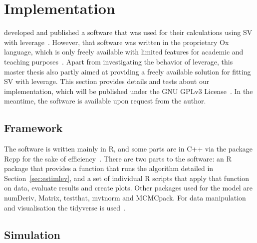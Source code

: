 \section{Implementation}

\citeauthor{Nakajima2009} developed and published a software that was used for their calculations using SV with leverage~\citep{nakajima2009code}.
However, that software was written in the proprietary Ox language, which is only freely available with limited features for academic and teaching purposes~\citep{doornik2009object}.
Apart from investigating the behavior of leverage, this master thesis also partly aimed at providing a freely available solution for fitting SV with leverage.
This section provides details and tests about our implementation, which will be published under the GNU GPLv3 License~\citep{gplv3}.
In the meantime, the software is available upon request from the author.

\subsection{Framework}

The software is written mainly in R, and some parts are in C++ via the package Rcpp for the sake of efficiency~\citep{rlanguage,rcpp2011,iso2016iec}.
There are two parts to the software: an R package that provides a function that runs the algorithm detailed in Section~\ref{sec:estimlev}, and a set of individual R scripts that apply that function on data, evaluate results and create plots.
Other packages used for the model are numDeriv, Matrix, testthat, mvtnorm and MCMCpack.
For data manipulation and visualisation the tidyverse is used~\citep{rnumderiv,rmatrix,rtestthat,rmvtnorm,rmcmcpack,rtidyverse}.

\subsection{Simulation}\label{sec:simulation}

